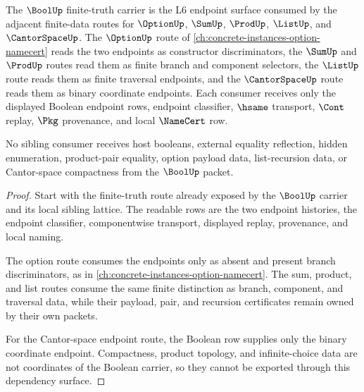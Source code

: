 \begin{theorem}
\label{thm:bool-sibling-dependency-surface}
The $\BoolUp$ finite-truth carrier is the L6 endpoint surface consumed by the adjacent finite-data routes for $\OptionUp$, $\SumUp$, $\ProdUp$, $\ListUp$, and $\CantorSpaceUp$. The $\OptionUp$ route of \autoref{ch:concrete-instances-option-namecert} reads the two endpoints as constructor discriminators, the $\SumUp$ and $\ProdUp$ routes read them as finite branch and component selectors, the $\ListUp$ route reads them as finite traversal endpoints, and the $\CantorSpaceUp$ route reads them as binary coordinate endpoints. Each consumer receives only the displayed Boolean endpoint rows, endpoint classifier, $\hsame$ transport, $\Cont$ replay, $\Pkg$ provenance, and local $\NameCert$ row.

No sibling consumer receives host booleans, external equality reflection, hidden enumeration, product-pair equality, option payload data, list-recursion data, or Cantor-space compactness from the $\BoolUp$ packet.
\end{theorem}
\begin{proof}
Start with the finite-truth route already exposed by the $\BoolUp$ carrier and its local sibling lattice. The readable rows are the two endpoint histories, the endpoint classifier, componentwise transport, displayed replay, provenance, and local naming.

The option route consumes the endpoints only as absent and present branch discriminators, as in \autoref{ch:concrete-instances-option-namecert}. The sum, product, and list routes consume the same finite distinction as branch, component, and traversal data, while their payload, pair, and recursion certificates remain owned by their own packets.

For the Cantor-space endpoint route, the Boolean row supplies only the binary coordinate endpoint. Compactness, product topology, and infinite-choice data are not coordinates of the Boolean carrier, so they cannot be exported through this dependency surface.
\end{proof}
